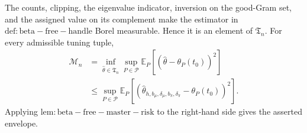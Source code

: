 The counts, clipping, the eigenvalue indicator, inversion on the good-Gram set, and the assigned value on its complement make the estimator in \(\mathrm{def:beta-free-handle}\) Borel measurable.  Hence it is an element of \(\mathfrak T_n\).  For every admissible tuning tuple,
\[
\begin{aligned}
\mathcal M_n
&=\inf_{\widehat\theta\in\mathfrak T_n}\sup_{P\in\mathcal P}
\mathbb E_P[(\widehat\theta-\theta_P(t_0))^2]\\
&\le\sup_{P\in\mathcal P}
\mathbb E_P[(\widehat\theta_{h,b_\mu,\delta_\mu,b_\pi,\delta_\pi}-\theta_P(t_0))^2].
\end{aligned}
\]
Applying \(\mathrm{lem:beta-free-master-risk}\) to the right-hand side gives the asserted envelope.